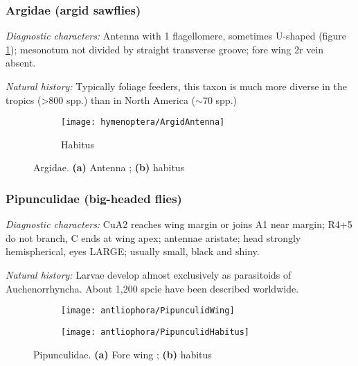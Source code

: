 \subsubsection{Argidae (argid sawflies)}%
\noindent{}\textit{Diagnostic characters:} Antenna with 1 flagellomere, sometimes U-shaped (figure \ref{fig:argid1}); mesonotum not divided by straight transverse groove; fore wing 2r vein absent.\vspace{3mm}

\noindent{}\textit{Natural history:} Typically foliage feeders, this taxon is much more diverse in the tropics (\textgreater800 spp.) than in North America ($\sim$70 spp.)

\begin{figure}[ht!]
    \centering
    \begin{subfigure}[ht!]{0.11\textwidth}
        \texttt{[image: hymenoptera/ArgidAntenna]}
        \caption{}
        \label{fig:argid1}
    \end{subfigure}
    \qquad
    \begin{subfigure}[ht!]{0.45\textwidth}
        \caption{Habitus}
        \label{fig:argid2}
    \end{subfigure}
    \caption{Argidae. \textbf{(a)} Antenna \citep[][pg. 106]{goulet1993hymenoptera}; \textbf{(b)} habitus \citep[][Fig. 26]{goulet1993hymenoptera}}\label{fig:argid}
\end{figure}

\subsubsection{Pipunculidae (big-headed flies)}%
\noindent{}\textit{Diagnostic characters:} CuA2 reaches wing margin or joins A1 near margin; R4+5 do not branch, C ends at wing apex; antennae aristate; head strongly hemispherical, eyes LARGE; usually small, black and shiny.\vspace{3mm}

\noindent{}\textit{Natural history:} Larvae develop almost exclusively as parasitoids of Auchenorrhyncha. About 1,200 spcie have been described worldwide.

\begin{figure}[ht!]
    \centering
    \begin{subfigure}[ht!]{0.45\textwidth}
        \texttt{[image: antliophora/PipunculidWing]}
        \caption{}
        \label{fig:pipunculid1}
    \end{subfigure}
    \qquad
    \begin{subfigure}[ht!]{0.42\textwidth}
        \texttt{[image: antliophora/PipunculidHabitus]}
        \caption{}
        \label{fig:pipunculid2}
    \end{subfigure}
    \caption{Pipunculidae. \textbf{(a)} Fore wing \citep[][Fig. 4.50]{mcalpine1981manual}; \textbf{(b)} habitus \citep[][Fig. 53.1]{mcalpine1981manualv2}}\label{fig:pipunculids}
\end{figure}

